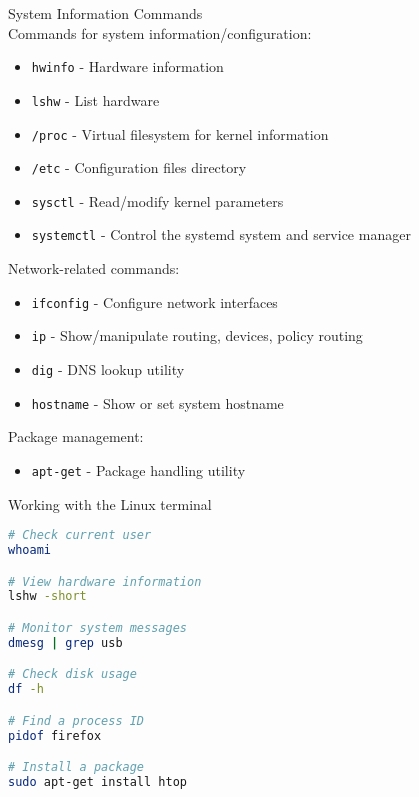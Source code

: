 \begin{definition}{System Information Commands}\\
    Commands for system information/configuration:
    \begin{itemize}
        \item \texttt{hwinfo} - Hardware information
        \item \texttt{lshw} - List hardware
        \item \texttt{/proc} - Virtual filesystem for kernel information
        \item \texttt{/etc} - Configuration files directory
        \item \texttt{sysctl} - Read/modify kernel parameters
        \item \texttt{systemctl} - Control the systemd system and service manager
    \end{itemize}
    
    Network-related commands:
    \begin{itemize}
        \item \texttt{ifconfig} - Configure network interfaces
        \item \texttt{ip} - Show/manipulate routing, devices, policy routing
        \item \texttt{dig} - DNS lookup utility
        \item \texttt{hostname} - Show or set system hostname
    \end{itemize}
    
    Package management:
    \begin{itemize}
        \item \texttt{apt-get} - Package handling utility
    \end{itemize}
\end{definition}

\begin{example2}
    {Working with the Linux terminal}
    
\begin{lstlisting}[language=bash, style=basesmol]
# Check current user
whoami

# View hardware information
lshw -short

# Monitor system messages
dmesg | grep usb

# Check disk usage
df -h

# Find a process ID
pidof firefox

# Install a package
sudo apt-get install htop
\end{lstlisting}
\end{example2}

